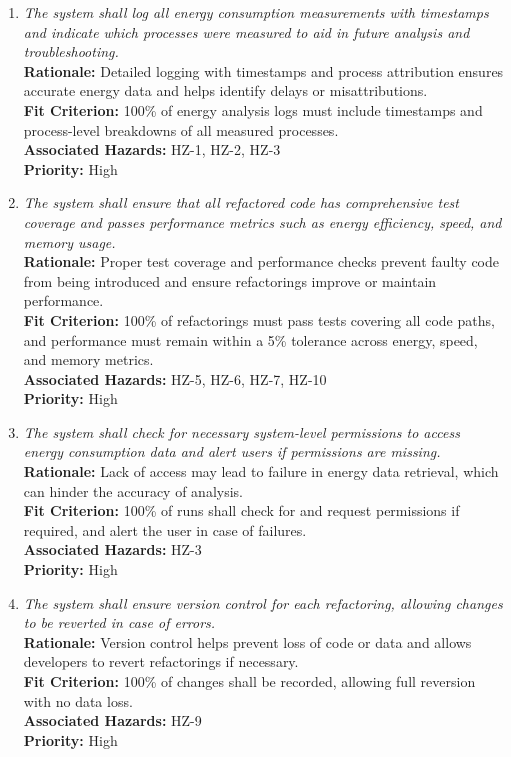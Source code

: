 \documentclass{article}
\begin{document}
\begin{enumerate}[label=SCR \arabic*., wide=0pt, leftmargin=*]

    \item \emph{The system shall log all energy consumption measurements with timestamps and indicate which processes were measured to aid in future analysis and troubleshooting.}\\
    {\bf Rationale:} Detailed logging with timestamps and process attribution ensures accurate energy data and helps identify delays or misattributions.\\
    {\bf Fit Criterion:} 100\% of energy analysis logs must include timestamps and process-level breakdowns of all measured processes.\\
    {\bf Associated Hazards:} HZ-1, HZ-2, HZ-3\\
    {\bf Priority:} High

    \item \emph{The system shall ensure that all refactored code has comprehensive test coverage and passes performance metrics such as energy efficiency, speed, and memory usage.}\\
    {\bf Rationale:} Proper test coverage and performance checks prevent faulty code from being introduced and ensure refactorings improve or maintain performance.\\
    {\bf Fit Criterion:} 100\% of refactorings must pass tests covering all code paths, and performance must remain within a 5\% tolerance across energy, speed, and memory metrics.\\
    {\bf Associated Hazards:} HZ-5, HZ-6, HZ-7, HZ-10\\
    {\bf Priority:} High

    \item \emph{The system shall check for necessary system-level permissions to access energy consumption data and alert users if permissions are missing.}\\
    {\bf Rationale:} Lack of access may lead to failure in energy data retrieval, which can hinder the accuracy of analysis.\\
    {\bf Fit Criterion:} 100\% of runs shall check for and request permissions if required, and alert the user in case of failures.\\
    {\bf Associated Hazards:} HZ-3\\
    {\bf Priority:} High

    \item \emph{The system shall ensure version control for each refactoring, allowing changes to be reverted in case of errors.}\\
    {\bf Rationale:} Version control helps prevent loss of code or data and allows developers to revert refactorings if necessary.\\
    {\bf Fit Criterion:} 100\% of changes shall be recorded, allowing full reversion with no data loss.\\
    {\bf Associated Hazards:} HZ-9\\
    {\bf Priority:} High


\end{enumerate}
\end{document}
